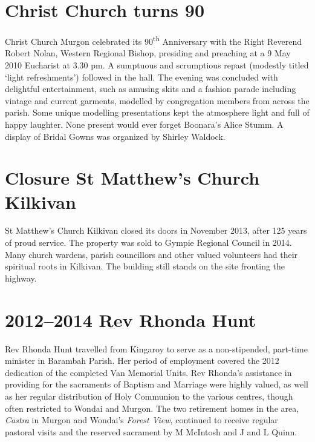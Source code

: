\hypertarget{christ-church-turns-90}{%
\section{Christ Church turns 90}\label{christ-church-turns-90}}

Christ Church Murgon celebrated its 90\textsuperscript{th} Anniversary with the Right Reverend Robert Nolan, Western Regional Bishop, presiding and preaching at a 9 May 2010 Eucharist at 3.30 pm. A sumptuous and scrumptious repast (modestly titled `light refreshments') followed in the hall. The evening was concluded with delightful entertainment, such as amusing skits and a fashion parade including vintage and current garments, modelled by congregation members from across the parish. Some unique modelling presentations kept the atmosphere light and full of happy laughter. None present would ever forget Boonara's Alice Stumm. A display of Bridal Gowns was organized by Shirley Waldock.

\hypertarget{closure-st-matthews-church-kilkivan}{%
\section{Closure St Matthew's Church Kilkivan}\label{closure-st-matthews-church-kilkivan}}

St Matthew's Church Kilkivan closed its doors in November 2013, after 125 years of proud service. The property was sold to Gympie Regional Council in 2014. Many church wardens, parish councillors and other valued volunteers had their spiritual roots in Kilkivan. The building still stands on the site fronting the highway.

\hypertarget{rev-rhonda-hunt}{%
\section{2012--2014 Rev Rhonda Hunt}\label{rev-rhonda-hunt}}

Rev Rhonda Hunt travelled from Kingaroy to serve as a non-stipended, part-time minister in Barambah Parish. Her period of employment covered the 2012 dedication of the completed Van Memorial Units. Rev Rhonda's assistance in providing for the sacraments of Baptism and Marriage were highly valued, as well as her regular distribution of Holy Communion to the various centres, though often restricted to Wondai and Murgon. The two retirement homes in the area, \emph{Castra} in Murgon and Wondai's \emph{Forest View}, continued to receive regular pastoral visits and the reserved sacrament by M McIntosh and J and L Quinn.

